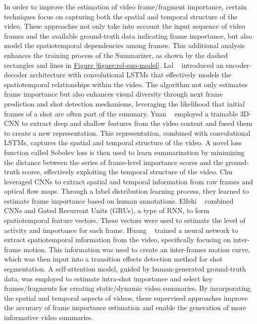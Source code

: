 In order to improve the estimation of video frame/fragment importance, certain techniques focus on capturing both the spatial and temporal structure of the video. These approaches not only take into account the input sequence of video frames and the available ground-truth data indicating frame importance, but also model the spatiotemporal dependencies among frames. This additional analysis enhances the training process of the Summarizer, as shown by the dashed rectangles and lines in \hyperref[figure:rel-sup-model]{Figure \ref{figure:rel-sup-model}}. Lal \etal~\cite{lal2019online} introduced an encoder-decoder architecture with convolutional LSTMs that effectively models the spatiotemporal relationships within the video. The algorithm not only estimates frame importance but also enhances visual diversity through next frame prediction and shot detection mechanisms, leveraging the likelihood that initial frames of a shot are often part of the summary. Yuan \etal~\cite{yuan2019spatiotemporal} employed a trainable 3D-CNN to extract deep and shallow features from the video content and fused them to create a new representation. This representation, combined with convolutional LSTMs, captures the spatial and temporal structure of the video. A novel loss function called Sobolev loss is then used to learn summarization by minimizing the distance between the series of frame-level importance scores and the ground-truth scores, effectively exploiting the temporal structure of the video. Chu \etal~\cite{chu2019spatiotemporal} leveraged CNNs to extract spatial and temporal information from raw frames and optical flow maps. Through a label distribution learning process, they learned to estimate frame importance based on human annotations.  Elfeki \etal~\cite{elfeki2019video} combined CNNs and Gated Recurrent Units (GRUs), a type of RNN, to form spatiotemporal feature vectors. These vectors were used to estimate the level of activity and importance for each frame. Huang \etal~\cite{huang2019novel} trained a neural network to extract spatiotemporal information from the video, specifically focusing on inter-frame motion. This information was used to create an inter-frames motion curve, which was then input into a transition effects detection method for shot segmentation. A self-attention model, guided by human-generated ground-truth data, was employed to estimate intra-shot importance and select key frames/fragments for creating static/dynamic video summaries. By incorporating the spatial and temporal aspects of videos, these supervised approaches improve the accuracy of frame importance estimation and enable the generation of more informative video summaries.

